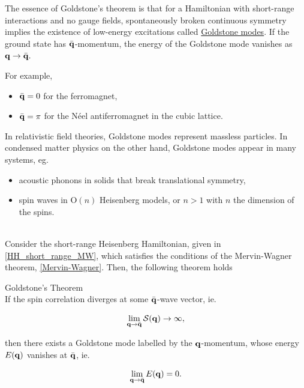 \documentclass{homework}
\begin{document}
\begin{tcolorbox}[colback = yellow, title = Physical Context]

The essence of Goldstone's theorem is that for a Hamiltonian with short-range interactions and no gauge fields, spontaneously broken continuous symmetry implies the existence of low-energy excitations called \underline{Goldstone modes}. If the ground state has $\bar{\bf q}$-momentum, the energy of the Goldstone mode vanishes as ${\bf q} \rightarrow \bar{\bf q}.$

\begin{tcolorbox}[colback = Bittersweet, title = Example]

For example, 

\begin{itemize}
    \item $\bar{ \bf q} = 0$ for the ferromagnet, 
    \item $\bar{ \bf q} = \pi$ for the Néel antiferromagnet in the cubic lattice.
\end{itemize}

\end{tcolorbox}

In relativistic field theories, Goldstone modes represent massless particles. In condensed matter physics on the other hand, Goldstone modes appear in many systems, eg.

\begin{itemize}
    \item acoustic phonons in solids that break translational symmetry, 
    \item spin waves in O$(n)$ Heisenberg models, or $n > 1$ with $n$ the dimension of the spins. 
\end{itemize}

\end{tcolorbox}

\blanky \\

Consider the short-range Heisenberg Hamiltonian, given in \cref{HH_short_range_MW}, which satisfies the conditions of the Mervin-Wagner theorem, \cref{Mervin-Wagner}. Then, the following theorem holds

\begin{theorem}\label{Goldstone_theo} Goldstone's Theorem \\

If the spin correlation diverges at some ${\bar{\bf q}}$-wave vector, ie.

$$
    \lim_{{\bf q} \rightarrow \bar{\bf q}} \mathcal{S}({\bf q}) \rightarrow \infty,
$$

then there exists a \textnormal{Goldstone mode} labelled by the ${\bf q}$-momentum, whose energy $E({\bf q})$ vanishes at ${\bar {\bf q}}$, ie.

$$
    \lim_{{\bf q} \rightarrow \bar{\bf q}} E({\bf q}) = 0.
$$

\end{theorem}
\end{document}
